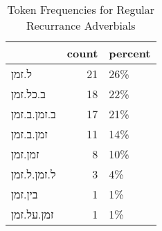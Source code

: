 \begin{table}[htbp!]
\centering
\caption{Token Frequencies for Regular Recurrance Adverbials}
\label{table:regtk_cp}
\begin{tabular}{lrl}
\toprule
{} &  count & percent \\
\midrule
ל.זמן       &     21 &     26\% \\
ב.כל.זמן    &     18 &     22\% \\
ב.זמן.ב.זמן &     17 &     21\% \\
זמן.ב.זמן   &     11 &     14\% \\
זמן.זמן     &      8 &     10\% \\
ל.זמן.ל.זמן &      3 &      4\% \\
בין.זמן     &      1 &      1\% \\
זמן.על.זמן  &      1 &      1\% \\
\bottomrule
\end{tabular}
\end{table}
